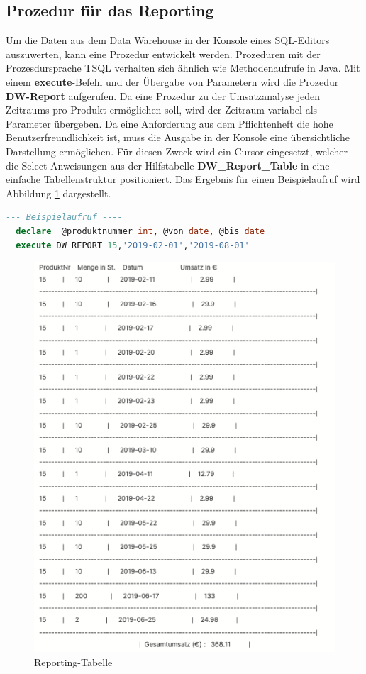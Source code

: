\subsection{Prozedur für das Reporting}
Um die Daten aus dem Data Warehouse in der Konsole eines SQL-Editors auszuwerten, kann eine Prozedur entwickelt werden. Prozeduren mit der Prozesdursprache TSQL verhalten sich ähnlich wie Methodenaufrufe in Java. Mit einem \textbf{execute}-Befehl und der Übergabe von Parametern wird die Prozedur \textbf{DW-Report} aufgerufen. Da eine Prozedur zu der Umsatzanalyse jeden Zeitraums pro Produkt ermöglichen soll, wird der Zeitraum variabel als Parameter übergeben. Da eine Anforderung aus dem Pflichtenheft die hohe Benutzerfreundlichkeit ist, muss die Ausgabe in der Konsole eine übersichtliche Darstellung ermöglichen. Für diesen Zweck wird ein Cursor eingesetzt, welcher die Select-Anweisungen aus der Hilfstabelle \textbf{DW\_Report\_Table} in eine einfache Tabellenstruktur positioniert. Das Ergebnis für einen Beispielaufruf wird Abbildung \ref{report_sql} dargestellt.

\begin{lstlisting}[language=SQL]
  --- Beispielaufruf ----
  declare  @produktnummer int, @von date, @bis date
  execute DW_REPORT 15,'2019-02-01','2019-08-01'
\end{lstlisting}

\begin{figure}[H]
  \centering
  \includegraphics[width=1.1\linewidth]{pictures/report_sql.png}
  \caption{Reporting-Tabelle}
  \label{report_sql}
\end{figure}

